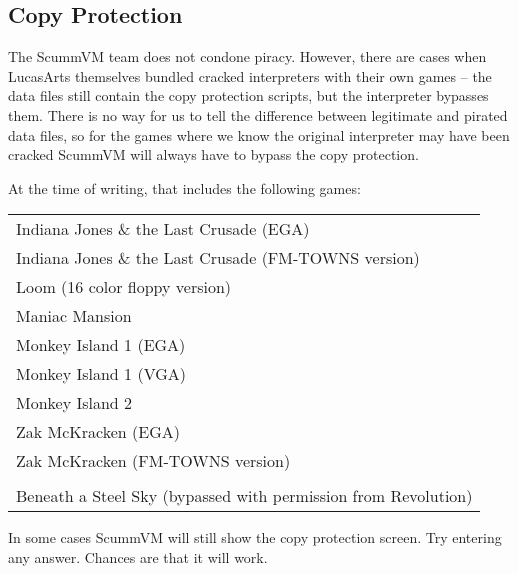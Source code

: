 \subsection{Copy Protection}

The ScummVM team does not condone piracy. However, there are cases when
LucasArts themselves bundled cracked interpreters with their own games --
the data files still contain the copy protection scripts, but the interpreter
bypasses them. There is no way for us to tell the difference between legitimate
and pirated data files, so for the games where we know the original interpreter
may have been cracked ScummVM will always have to bypass the copy protection.

At the time of writing, that includes the following games:

\begin{tabular}{l}
Indiana Jones \& the Last Crusade (EGA)\\
Indiana Jones \& the Last Crusade (FM-TOWNS version)\\
Loom (16 color floppy version)\\
Maniac Mansion\\
Monkey Island 1 (EGA)\\
Monkey Island 1 (VGA)\\
Monkey Island 2\\
Zak McKracken (EGA)\\
Zak McKracken (FM-TOWNS version)\\
\\
Beneath a Steel Sky (bypassed with permission from Revolution)
\end{tabular}

In some cases ScummVM will still show the copy protection screen. Try entering
any answer. Chances are that it will work.
